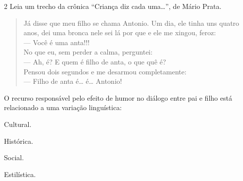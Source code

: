 \num{2} Leia um trecho da crônica ``Criança diz cada uma\ldots{}'', de Mário
Prata.

\begin{quote}
\noindent Já disse que meu filho se chama Antonio. Um dia, ele tinha uns quatro
\noindent anos, dei uma bronca nele sei lá por que e ele me xingou, feroz:\\
\noindent — Você é uma anta!!!\\
\noindent No que eu, sem perder a calma, perguntei:\\
\noindent — Ah, é? E quem é filho de anta, o que quê é?\\
\noindent Pensou dois segundos e me desarmou completamente:\\
\noindent — Filho de anta é\ldots{} é\ldots{} Antonio!\\

\end{quote}

\noindent O recurso responsável pelo efeito de humor no diálogo entre pai e filho
está relacionado a uma variação linguística:

\begin{escolha}
\item Cultural.
\item Histórica.
\item Social.
\item Estilística.
\end{escolha}



